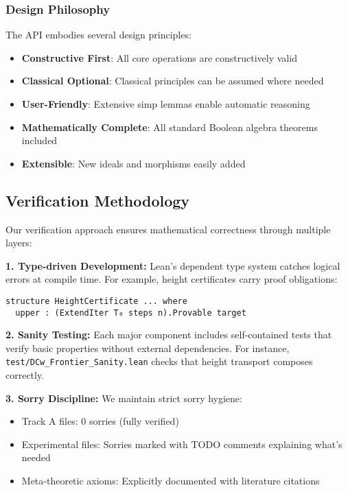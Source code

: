 \documentclass[11pt]{article}
\theoremstyle{plain}
\theoremstyle{definition}
\begin{document}
\subsubsection{Design Philosophy}

The API embodies several design principles:
\begin{itemize}
\item \textbf{Constructive First}: All core operations are constructively valid
\item \textbf{Classical Optional}: Classical principles can be assumed where needed
\item \textbf{User-Friendly}: Extensive simp lemmas enable automatic reasoning
\item \textbf{Mathematically Complete}: All standard Boolean algebra theorems included
\item \textbf{Extensible}: New ideals and morphisms easily added
\end{itemize}

\subsection{Verification Methodology}

Our verification approach ensures mathematical correctness through multiple layers:

\textbf{1. Type-driven Development:} Lean's dependent type system catches logical errors at compile time. For example, height certificates carry proof obligations:
\begin{verbatim}
structure HeightCertificate ... where
  upper : (ExtendIter T₀ steps n).Provable target
\end{verbatim}

\textbf{2. Sanity Testing:} Each major component includes self-contained tests that verify basic properties without external dependencies. For instance, \texttt{test/DCw\_Frontier\_Sanity.lean} checks that height transport composes correctly.

\textbf{3. Sorry Discipline:} We maintain strict sorry hygiene:
\begin{itemize}
\item Track A files: 0 sorries (fully verified)
\item Experimental files: Sorries marked with TODO comments explaining what's needed
\item Meta-theoretic axioms: Explicitly documented with literature citations
\end{itemize}
\end{document}

